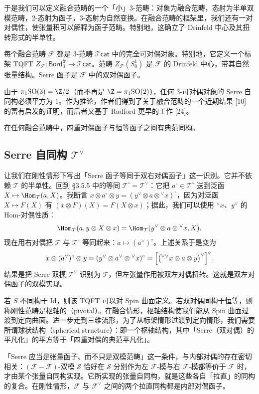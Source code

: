 于是我们可以定义融合范畴的一个「小」3-范畴：对象为融合范畴，态射为半单双模范畴，2-态射为函子，3-态射为自然变换。在融合范畴的框架里，我们还有一对对偶性，使张量积可以解释为函子范畴。特别地，这确立了 Drinfeld 中心及其扭转形式的半单性。

\begin{theorem}
每个融合范畴 $\mathcal{F}$ 都是 3-范畴 $\mathcal{T}\mathsf{cat}$ 中的完全可对偶对象。特别地，它定义一个标架 TQFT $Z_{\mathcal{F}}\colon\mathsf{Bord}^{\mathrm{fr}}_3\to\mathcal{T}\mathsf{cat}$。范畴 $Z_{\mathcal{F}}(S^1_0)$ 是 $\mathcal{F}$ 的 Drinfeld 中心，带其自然张量结构。Serre 函子是 $\mathcal{F}$ 中的双对偶函子。
\end{theorem}

由于 $\pi_1\mathrm{SO}(3)=\Z/2$（而不再是 $\Z=\pi_1\mathrm{SO}(2)$），任何 3-可对偶对象的 Serre 自同构必须平方为 $1$。作为推论，作者们得到了关于融合范畴的一个近期结果 [10] 的富有启发的证明，而后者又基于 Radford 更早的工作 [24]。

\begin{corollary}
在任何融合范畴中，四重对偶函子与恒等函子之间有典范同构。
\end{corollary}

\subsection{Serre 自同构 $\mathcal{T}^\vee$}

让我们在刚性情形下写出「Serre 函子等同于双右对偶函子」这一识别。它并不依赖 $\mathcal{T}$ 的半单性。回到 §3.5.5 中的等同 $\mathcal{T}^\circ=\mathcal{T}^\vee$：它把 $a^\circ\in\mathcal{T}^\circ$ 送到泛函 $X\mapsto\Hom_{\mathcal{T}}(a,X)$。我断言 $x\otimes a^\circ\otimes y=(y^\vee\otimes a\otimes{}^\vee x)^\circ$，因为对泛函 $X\mapsto F(X)$ 有 $(x\otimes F)(X)=F(X\otimes x)$；据此，我们可以使用 ${}^\vee x$、$y^\vee$ 的 Hom-对偶性质：
\[
\Hom_{\mathcal{T}}(a,y\otimes X\otimes x)=\Hom_{\mathcal{T}}(y^\vee\otimes a\otimes{}^\vee x,X).
\]
现在用右对偶把 $\mathcal{T}$ 与 $\mathcal{T}^\circ$ 等同起来：$a\mapsto(a^\vee)^\circ$。上述关系于是变为
\[
x\otimes(a^\vee)^\circ\otimes y=(y^\vee\otimes a^\vee\otimes{}^\vee x)^\circ
=\Bigl[\bigl({}^{\vee\vee}x\otimes a\otimes y\bigr)^\vee\Bigr]^\circ .
\]
结果是把 Serre 双模 $\mathcal{T}^\vee$ 识别为 $\mathcal{T}$，但左张量作用被双左对偶扭转。这就是双左对偶函子的双模实现。

\begin{remark}
若 $S$ 不同构于 $\mathrm{Id}$，则该 TQFT 可以对 Spin 曲面定义。若双对偶同构于恒等，则称刚性范畴是枢轴的（pivotal）。在融合情形，枢轴结构使我们能从 Spin 曲面过渡到定向曲面。进一步走到三维流形，为了从标架情形过渡到定向情形，我们需要所谓球状结构（spherical structure）：即一个枢轴结构，其中「Serre（双对偶）的平凡化」的平方等于「四重对偶的典范平凡化」。

「Serre 应当是张量函子、而不只是双模范畴」这一条件，与内部对偶的存在密切相关：$(\mathcal{F}-\mathcal{F})$-双模 $\mathcal{S}$ 恰好在 $\mathcal{S}$ 分别作为左 $\mathcal{F}$-模与右 $\mathcal{F}$-模都等价于 $\mathcal{F}$ 时，才由某个张量自同构实现。它所实现的张量自同构，就是这些各自「拉直」的同构的复合。在刚性情形，$\mathcal{F}$ 与 $\mathcal{F}^\vee$ 之间的两个拉直同构都是内部对偶函子。
\end{remark}
